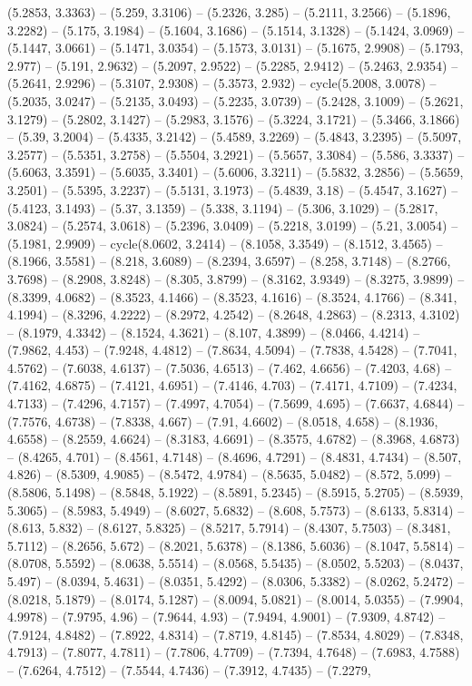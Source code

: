 (5.2853, 3.3363) -- (5.259, 3.3106) -- (5.2326, 3.285) -- (5.2111, 3.2566) -- (5.1896, 3.2282) -- (5.175, 3.1984) -- (5.1604, 3.1686) -- (5.1514, 3.1328) -- (5.1424, 3.0969) -- (5.1447, 3.0661) -- (5.1471, 3.0354) -- (5.1573, 3.0131) -- (5.1675, 2.9908) -- (5.1793, 2.977) -- (5.191, 2.9632) -- (5.2097, 2.9522) -- (5.2285, 2.9412) -- (5.2463, 2.9354) -- (5.2641, 2.9296) -- (5.3107, 2.9308) -- (5.3573, 2.932) -- cycle(5.2008, 3.0078) -- (5.2035, 3.0247) -- (5.2135, 3.0493) -- (5.2235, 3.0739) -- (5.2428, 3.1009) -- (5.2621, 3.1279) -- (5.2802, 3.1427) -- (5.2983, 3.1576) -- (5.3224, 3.1721) -- (5.3466, 3.1866) -- (5.39, 3.2004) -- (5.4335, 3.2142) -- (5.4589, 3.2269) -- (5.4843, 3.2395) -- (5.5097, 3.2577) -- (5.5351, 3.2758) -- (5.5504, 3.2921) -- (5.5657, 3.3084) -- (5.586, 3.3337) -- (5.6063, 3.3591) -- (5.6035, 3.3401) -- (5.6006, 3.3211) -- (5.5832, 3.2856) -- (5.5659, 3.2501) -- (5.5395, 3.2237) -- (5.5131, 3.1973) -- (5.4839, 3.18) -- (5.4547, 3.1627) -- (5.4123, 3.1493) -- (5.37, 3.1359) -- (5.338, 3.1194) -- (5.306, 3.1029) -- (5.2817, 3.0824) -- (5.2574, 3.0618) -- (5.2396, 3.0409) -- (5.2218, 3.0199) -- (5.21, 3.0054) -- (5.1981, 2.9909) -- cycle(8.0602, 3.2414) -- (8.1058, 3.3549) -- (8.1512, 3.4565) -- (8.1966, 3.5581) -- (8.218, 3.6089) -- (8.2394, 3.6597) -- (8.258, 3.7148) -- (8.2766, 3.7698) -- (8.2908, 3.8248) -- (8.305, 3.8799) -- (8.3162, 3.9349) -- (8.3275, 3.9899) -- (8.3399, 4.0682) -- (8.3523, 4.1466) -- (8.3523, 4.1616) -- (8.3524, 4.1766) -- (8.341, 4.1994) -- (8.3296, 4.2222) -- (8.2972, 4.2542) -- (8.2648, 4.2863) -- (8.2313, 4.3102) -- (8.1979, 4.3342) -- (8.1524, 4.3621) -- (8.107, 4.3899) -- (8.0466, 4.4214) -- (7.9862, 4.453) -- (7.9248, 4.4812) -- (7.8634, 4.5094) -- (7.7838, 4.5428) -- (7.7041, 4.5762) -- (7.6038, 4.6137) -- (7.5036, 4.6513) -- (7.462, 4.6656) -- (7.4203, 4.68) -- (7.4162, 4.6875) -- (7.4121, 4.6951) -- (7.4146, 4.703) -- (7.4171, 4.7109) -- (7.4234, 4.7133) -- (7.4296, 4.7157) -- (7.4997, 4.7054) -- (7.5699, 4.695) -- (7.6637, 4.6844) -- (7.7576, 4.6738) -- (7.8338, 4.667) -- (7.91, 4.6602) -- (8.0518, 4.658) -- (8.1936, 4.6558) -- (8.2559, 4.6624) -- (8.3183, 4.6691) -- (8.3575, 4.6782) -- (8.3968, 4.6873) -- (8.4265, 4.701) -- (8.4561, 4.7148) -- (8.4696, 4.7291) -- (8.4831, 4.7434) -- (8.507, 4.826) -- (8.5309, 4.9085) -- (8.5472, 4.9784) -- (8.5635, 5.0482) -- (8.572, 5.099) -- (8.5806, 5.1498) -- (8.5848, 5.1922) -- (8.5891, 5.2345) -- (8.5915, 5.2705) -- (8.5939, 5.3065) -- (8.5983, 5.4949) -- (8.6027, 5.6832) -- (8.608, 5.7573) -- (8.6133, 5.8314) -- (8.613, 5.832) -- (8.6127, 5.8325) -- (8.5217, 5.7914) -- (8.4307, 5.7503) -- (8.3481, 5.7112) -- (8.2656, 5.672) -- (8.2021, 5.6378) -- (8.1386, 5.6036) -- (8.1047, 5.5814) -- (8.0708, 5.5592) -- (8.0638, 5.5514) -- (8.0568, 5.5435) -- (8.0502, 5.5203) -- (8.0437, 5.497) -- (8.0394, 5.4631) -- (8.0351, 5.4292) -- (8.0306, 5.3382) -- (8.0262, 5.2472) -- (8.0218, 5.1879) -- (8.0174, 5.1287) -- (8.0094, 5.0821) -- (8.0014, 5.0355) -- (7.9904, 4.9978) -- (7.9795, 4.96) -- (7.9644, 4.93) -- (7.9494, 4.9001) -- (7.9309, 4.8742) -- (7.9124, 4.8482) -- (7.8922, 4.8314) -- (7.8719, 4.8145) -- (7.8534, 4.8029) -- (7.8348, 4.7913) -- (7.8077, 4.7811) -- (7.7806, 4.7709) -- (7.7394, 4.7648) -- (7.6983, 4.7588) -- (7.6264, 4.7512) -- (7.5544, 4.7436) -- (7.3912, 4.7435) -- (7.2279, 
